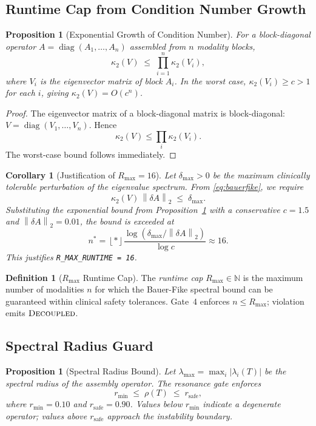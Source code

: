 \documentclass[11pt,a4paper]{article}
\theoremstyle{tealstyle}
\newtheorem{proposition}[theorem]{Proposition}
\newtheorem{corollary}[theorem]{Corollary}
\theoremstyle{definition}
\newtheorem{definition}[theorem]{Definition}
\newcommand{\norm}[1]{\left\lVert #1 \right\rVert}
\newcommand{\abs}[1]{\left\lvert #1 \right\rvert}
\newcommand{\N}{\mathbb{N}}
\newcommand{\cond}{\kappa}
\newcommand{\spectrad}{\rho}
\newcommand{\Rmax}{R_{\max}}
\newcommand{\decoupled}{\textsc{Decoupled}}
\newcommand{\floor}[1]{\left\lfloor #1 \right\rfloor}
\newcommand{\dA}{\delta A}
\newcommand{\eigvec}{V}
\DeclareMathOperator{\diag}{diag}
\begin{document}
\subsection{Runtime Cap from Condition Number Growth}

\begin{proposition}[Exponential Growth of Condition Number]
\label{prop:condgrowth}
For a block-diagonal operator
$A = \diag(A_1, \dots, A_n)$ assembled from $n$ modality blocks,
\[
  \cond_2(\eigvec) \;\le\; \prod_{i=1}^n \cond_2(\eigvec_i),
\]
where $\eigvec_i$ is the eigenvector matrix of block $A_i$.
In the worst case, $\cond_2(\eigvec_i) \ge c > 1$ for each $i$, giving
$\cond_2(\eigvec) = O(c^n)$.
\end{proposition}

\begin{proof}
The eigenvector matrix of a block-diagonal matrix is block-diagonal:
$\eigvec = \diag(\eigvec_1,\dots,\eigvec_n)$.
Hence
\[
\cond_2(\eigvec)
\le \prod_i \cond_2(\eigvec_i).
\]
The worst-case bound follows immediately.
\end{proof}

\begin{corollary}[Justification of $\Rmax = 16$]
\label{cor:rmax}
Let $\delta_{\max} > 0$ be the maximum clinically tolerable perturbation
of the eigenvalue spectrum.
From \eqref{eq:bauerfike}, we require
\[
  \cond_2(\eigvec)\,\norm{\dA}_2 \;\le\; \delta_{\max}.
\]
Substituting the exponential bound from Proposition~\ref{prop:condgrowth}
with a conservative $c = 1.5$ and $\norm{\dA}_2 = 0.01$,
the bound is exceeded at
\[
  n^* = \floor*{\frac{\log(\delta_{\max} / \norm{\dA}_2)}{\log c}}
      \approx 16.
\]
This justifies \texttt{R\_MAX\_RUNTIME = 16}.
\end{corollary}

\begin{definition}[$\Rmax$ Runtime Cap]
\label{def:rmax}
The \emph{runtime cap} $\Rmax \in \N$ is the maximum number of modalities
$n$ for which the Bauer-Fike spectral bound can be guaranteed within
clinical safety tolerances.
Gate~4 enforces $n \le \Rmax$; violation emits
$\decoupled$.
\end{definition}

\subsection{Spectral Radius Guard}

\begin{proposition}[Spectral Radius Bound]
\label{prop:spectrad}
Let $\lambda_{\max} = \max_i \abs{\lambda_i(T)}$ be the spectral radius of
the assembly operator.
The resonance gate enforces
\begin{equation}
  \label{eq:resonance}
  r_{\min} \;\le\; \spectrad(T) \;\le\; r_{\mathrm{safe}},
\end{equation}
where $r_{\min} = 0.10$ and $r_{\mathrm{safe}} = 0.90$.
Values below $r_{\min}$ indicate a degenerate operator;
values above $r_{\mathrm{safe}}$ approach the instability boundary.
\end{proposition}
\end{document}
